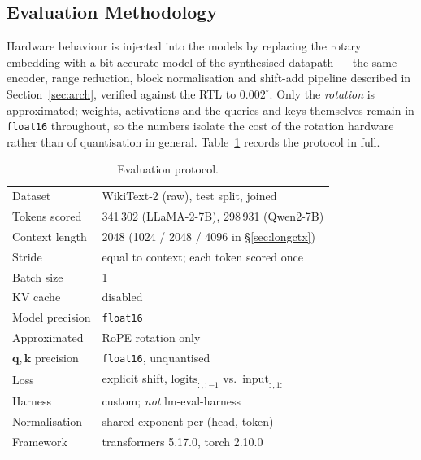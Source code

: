 %
%

\subsection{Evaluation Methodology}
\label{sec:evalmethod}

Hardware behaviour is injected into the models by replacing the rotary
embedding with a bit-accurate model of the synthesised datapath --- the same
encoder, range reduction, block normalisation and shift-add pipeline described
in Section~\ref{sec:arch}, verified against the RTL to $0.002^{\circ}$. Only
the \emph{rotation} is approximated; weights, activations and the queries and
keys themselves remain in \texttt{float16} throughout, so the numbers isolate
the cost of the rotation hardware rather than of quantisation in general.
Table~\ref{tab:method} records the protocol in full.

\begin{table}[t]
\caption{Evaluation protocol.}
\label{tab:method}
\centering
\begin{tabular}{ll}
\toprule
Dataset & WikiText-2 (raw), test split, joined \\
Tokens scored & 341\,302 (LLaMA-2-7B), 298\,931 (Qwen2-7B) \\
Context length & 2048 (1024 / 2048 / 4096 in \S\ref{sec:longctx}) \\
Stride & equal to context; each token scored once \\
Batch size & 1 \\
KV cache & disabled \\
Model precision & \texttt{float16} \\
Approximated & RoPE rotation only \\
$\mathbf{q},\mathbf{k}$ precision & \texttt{float16}, unquantised \\
Loss & explicit shift, $\text{logits}_{:,:-1}$ vs.\ $\text{input}_{:,1:}$ \\
Harness & custom; \emph{not} lm-eval-harness \\
Normalisation & shared exponent per (head, token) \\
Framework & transformers 5.17.0, torch 2.10.0 \\
\bottomrule
\end{tabular}
\end{table}

